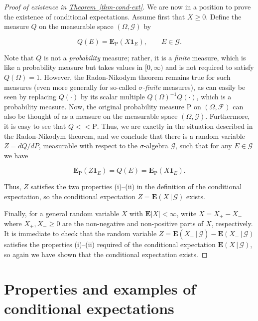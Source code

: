 \documentclass[11pt]{report}
\theoremstyle{plain}
\theoremstyle{definition}
\begin{document}
\begin{proof}[Proof of existence in \texorpdfstring{\hyperref[thm-cond-ext]{Theorem~\ref*{thm-cond-ext}}}{Theorem}]
We are now in a position to prove the existence of
conditional expectations. Assume first that $X\ge 0$.
Define the measure $Q$ on the measurable space
$(\Omega, \mathcal{G})$ by

\[
Q(E) = \mathbf{E}_{\mathrm{P}}(X \mathbf{1}_E), \qquad E\in\mathcal{G}.
\]

\noindent Note that $Q$ is not a \emph{probability} measure; rather,
it is a \emph{finite} measure, which is like a probability
measure but takes values in $[0,\infty)$ and is not
required to satisfy $Q(\Omega)=1$. However, the
Radon-Nikodym theorem remains true for such measures
(even more generally for so-called \emph{$\sigma$-finite}
measures), as can easily be seen by replacing
$Q(\cdot)$ by its scalar multiple
$Q(\Omega)^{-1} Q(\cdot)$, which is a probability
measure. Now, the original probability measure
$\mathrm{P}$ on $(\Omega, \mathcal{F})$ can also be
thought of as a measure on the measurable space
$(\Omega, \mathcal{G})$. Furthermore, it is easy to
see that $Q << \mathrm{P}$. Thus, we are exactly in
the situation described in the Radon-Nikodym theorem,
and we conclude that there is a random variable
$Z=dQ/dP$, measurable with respect to the
$\sigma$-algebra $\mathcal{G}$, such that for any
$E\in\mathcal{G}$ we have

\[
\mathbf{E}_{\mathrm{P}}(Z \mathbf{1}_E) = Q(E) = \mathbf{E}_{\mathrm{P}}(X \mathbf{1}_E).
\]

\noindent Thus, $Z$ satisfies the two properties (i)--(ii) in
the definition of the conditional expectation, so the
conditional expectation
$Z=\mathbf{E}\left(X\,|\,\mathcal{G}\right)$ exists.

Finally, for a general random variable $X$ with
$\mathbf{E}|X|<\infty$, write $X=X_+-X_-$ where
$X_+, X_-\ge 0$ are the non-negative and non-positive
parts of $X$, respectively. It is immediate to check
that the random variable
$Z = \mathbf{E}\left(X_+\,|\,\mathcal{G}\right) -
\mathbf{E}\left(X_-\,|\,\mathcal{G}\right)$
satisfies the properties (i)--(ii) required of the
conditional expectation
$\mathbf{E}\left(X\,|\,\mathcal{G}\right)$, so again
we have shown that the conditional expectation exists.
\end{proof}

\section{Properties and examples of conditional expectations}
\end{document}
